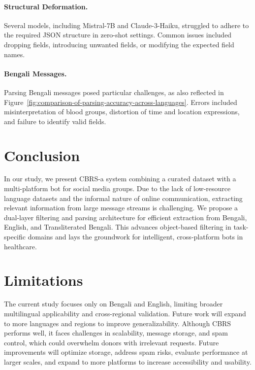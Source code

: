 \documentclass[11pt]{article}
\begin{document}
\paragraph{Structural Deformation.}  
Several models, including Mistral-7B and Claude-3-Haiku, struggled to adhere to the required JSON structure in zero-shot settings. Common issues included dropping fields, introducing unwanted fields, or modifying the expected field names.

\paragraph{Bengali Messages.}  
Parsing Bengali messages posed particular challenges, as also reflected in Figure~\ref{fig:comparison-of-parsing-accuracy-across-languages}. Errors included misinterpretation of blood groups, distortion of time and location expressions, and failure to identify valid fields.





\section{Conclusion}
In our study, we present CBRS-a system combining a curated dataset with a multi-platform bot for social media groups. Due to the lack of low-resource language datasets and the informal nature of online communication, extracting relevant information from large message streams is challenging. We propose a dual-layer filtering and parsing architecture for efficient extraction from Bengali, English, and Transliterated Bengali. 
This advances object-based filtering in task-specific domains and lays the groundwork for intelligent, cross-platform bots in healthcare. 

\section{Limitations}
The current study focuses only on Bengali and English, limiting broader multilingual applicability and cross-regional validation. Future work will expand to more languages and regions to improve generalizability. Although CBRS performs well, it faces challenges in scalability, message storage, and spam control, which could overwhelm donors with irrelevant requests. Future improvements will optimize storage, address spam risks, evaluate performance at larger scales, and expand to more platforms to increase accessibility and usability.
\end{document}
